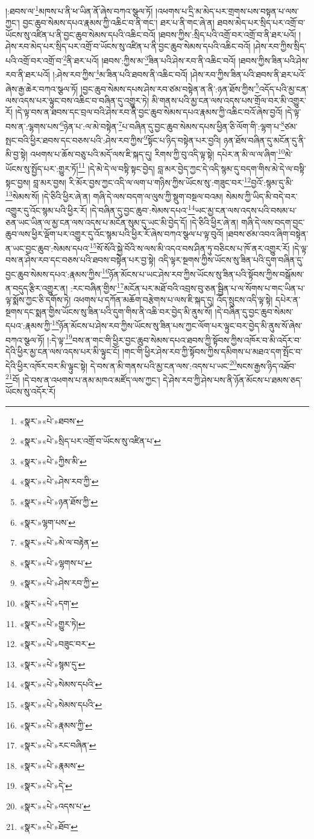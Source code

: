 །:ཐབས་ལ་\footnote{«སྣར་»«པེ་»ཐབས་}མཁས་པ་ནི་ཕ་ཡིན་ནོ་ཞེས་བཀའ་སྩལ་ཏོ། །འཕགས་པ་དྲི་མ་མེད་པར་གྲགས་པས་བསྟན་པ་ལས་ཀྱང་། བྱང་ཆུབ་སེམས་དཔའ་རྣམས་ཀྱི་འཆིང་བ་ནི་གང་། ཐར་པ་ནི་གང་ཞེ་ན། ཐབས་མེད་པར་སྲིད་པར་འགྲོ་བ་ཡོངས་སུ་འཛིན་པ་ནི་བྱང་ཆུབ་སེམས་དཔའི་འཆིང་བའོ། །ཐབས་ཀྱིས་:སྲིད་པའི་འགྲོ་བར་འགྲོ་བ་ནི་ཐར་པའོ། །ཤེས་རབ་མེད་པར་སྲིད་པར་འགྲོ་བ་ཡོངས་སུ་འཛིན་པ་ནི་བྱང་ཆུབ་སེམས་དཔའི་འཆིང་བའོ། །ཤེས་རབ་ཀྱིས་སྲིད་པའི་འགྲོ་བར་འགྲོ་བ་\footnote{«སྣར་»«པེ་»སྲིད་པར་འགྲོ་བ་ཡོངས་སུ་འཛིན་པ་}ནི་ཐར་པའོ། །ཐབས་:ཀྱིས་མ་\footnote{«སྣར་»«པེ་»ཀྱིས་མི་}ཟིན་པའི་ཤེས་རབ་ནི་འཆིང་བའོ། །ཐབས་ཀྱིས་ཟིན་པའི་ཤེས་རབ་ནི་ཐར་པའོ། །:ཤེས་རབ་ཀྱིས་\footnote{«སྣར་»«པེ་»ཤེས་རབ་ཀྱི་}མ་ཟིན་པའི་ཐབས་ནི་འཆིང་བའོ། །ཤེས་རབ་ཀྱིས་ཟིན་པའི་ཐབས་ནི་ཐར་པའོ་ཞེས་རྒྱ་ཆེར་བཀའ་སྩལ་ཏོ། །བྱང་ཆུབ་སེམས་དཔས་ཤེས་རབ་ཙམ་བསྟེན་ན་ནི་:ཉན་ཐོས་ཀྱིས་\footnote{«སྣར་»«པེ་»ཉན་ཐོས་ཀྱི་}འདོད་པའི་མྱ་ངན་ལས་འདས་པར་ལྟུང་བས་འཆིང་བ་བཞིན་དུ་འགྱུར་ཏེ། མི་གནས་པའི་མྱ་ངན་ལས་འདས་པས་གྲོལ་བར་མི་འགྱུར་རོ། །དེ་ལྟ་བས་ན་ཐབས་དང་བྲལ་བའི་ཤེས་རབ་ནི་བྱང་ཆུབ་སེམས་དཔའ་རྣམས་ཀྱི་འཆིང་བའོ་ཞེས་བྱའོ། །དེ་ལྟ་བས་ན་:ལྷགས་པས་\footnote{«སྣར་»ལྷག་པས་}ཉེན་པ་:ལ་མེ་བསྟེན་\footnote{«སྣར་»«པེ་»མེ་ལ་བརྟེན་}པ་བཞིན་དུ་བྱང་ཆུབ་སེམས་དཔས་ཕྱིན་ཅི་ལོག་གི་:ལྷག་པ་\footnote{«སྣར་»«པེ་»ལྷགས་པ་}ཙམ་སྤང་བའི་ཕྱིར་ཐབས་དང་བཅས་པའི་:ཤེས་རབ་ཀྱིས་\footnote{«སྣར་»«པེ་»ཤེས་རབ་ཀྱི་}སྟོང་པ་ཉིད་བསྟེན་པར་བྱའི། ཉན་ཐོས་བཞིན་དུ་མངོན་དུ་ནི་མི་བྱ་སྟེ། འཕགས་པ་ཆོས་བཅུ་པའི་མདོ་ལས་ཇི་སྐད་དུ། རིགས་ཀྱི་བུ་འདི་ལྟ་སྟེ། དཔེར་ན་མི་ལ་ལ་ཞིག་\footnote{«སྣར་»«པེ་»དག་}མེ་ཡོངས་སུ་སྤྱོད་པར་:གྱུར་ཏོ།\footnote{«སྣར་»«པེ་»གྱུར་ཏེ།} །དེ་མེ་དེ་ལ་བསྟི་སྟང་བྱེད། བླ་མར་བྱེད་ཀྱང་དེ་འདི་སྙམ་དུ་བདག་གིས་མེ་དེ་ལ་བསྟི་སྟང་བྱས། བླ་མར་བྱས། རི་མོར་བྱས་ཀྱང་འདི་ལ་ལག་པ་གཉིས་ཀྱིས་ཡོངས་སུ་:གཟུང་བར་\footnote{«སྣར་»«པེ་»བཟུང་བར་}བྱའོ་:སྙམ་དུ་མི་\footnote{«སྣར་»«པེ་»སྙམ་དུ་}སེམས་སོ། །དེ་ཅིའི་ཕྱིར་ཞེ་ན། གཞི་དེ་ལས་བདག་ལ་ལུས་ཀྱི་སྡུག་བསྔལ་བའམ། སེམས་ཀྱི་ཡིད་མི་བདེ་བར་འགྱུར་དུ་འོང་སྙམ་པའི་ཕྱིར་རོ། །དེ་བཞིན་དུ་བྱང་ཆུབ་:སེམས་དཔའ་\footnote{«སྣར་»«པེ་»སེམས་དཔའི་}ཡང་མྱ་ངན་ལས་འདས་པའི་བསམ་པ་ཅན་ཡང་ཡིན་ལ་མྱ་ངན་ལས་འདས་པ་མངོན་སུམ་དུ་ཡང་མི་བྱེད་དོ། །དེ་ཅིའི་ཕྱིར་ཞེ་ན། གཞི་དེ་ལས་བདག་བྱང་ཆུབ་ལས་ཕྱིར་ལྡོག་པར་འགྱུར་དུ་འོང་སྙམ་པའི་ཕྱིར་རོ་ཞེས་བཀའ་སྩལ་པ་ལྟ་བུའོ། །ཐབས་ཙམ་འབའ་ཞིག་བསྟེན་ན་ཡང་བྱང་ཆུབ་:སེམས་དཔའ་\footnote{«སྣར་»«པེ་»སེམས་དཔའི་}སོ་སོའི་སྐྱེ་བོའི་ས་ལས་མི་འདའ་བས་ཤིན་ཏུ་བཅིངས་པ་ཁོ་ནར་འགྱུར་རོ། །དེ་ལྟ་བས་ན་ཤེས་རབ་དང་བཅས་པའི་ཐབས་བསྟེན་པར་བྱ་སྟེ། འདི་ལྟར་སྔགས་ཀྱིས་ཡོངས་སུ་ཟིན་པའི་དུག་བཞིན་དུ་བྱང་ཆུབ་སེམས་དཔའ་:རྣམས་ཀྱིས་\footnote{«སྣར་»«པེ་»རྣམས་ཀྱི་}ཉོན་མོངས་པ་ཡང་ཤེས་རབ་ཀྱིས་ཡོངས་སུ་ཟིན་པའི་སྟོབས་ཀྱིས་བསྒོམས་ན་བདུད་རྩིར་འགྱུར་ན། :རང་བཞིན་གྱིས་\footnote{«སྣར་»«པེ་»རང་བཞིན་}མངོན་པར་མཐོ་བའི་འབྲས་བུ་ཅན་སྦྱིན་པ་ལ་སོགས་པ་གང་ཡིན་པ་ལྟ་སྨོས་ཀྱང་ཅི་དགོས་ཏེ། འཕགས་པ་དཀོན་མཆོག་བརྩེགས་པ་ལས་ཇི་སྐད་དུ། འོད་སྲུངས་འདི་ལྟ་སྟེ། དཔེར་ན་སྔགས་དང་སྨན་གྱིས་ཡོངས་སུ་ཟིན་པའི་དུག་གིས་ནི་འཆི་བར་བྱེད་མི་ནུས་སོ། །དེ་བཞིན་དུ་བྱང་ཆུབ་སེམས་དཔའ་:རྣམས་ཀྱི་\footnote{«སྣར་»«པེ་»རྣམས་}ཉོན་མོངས་པ་ཤེས་རབ་ཀྱིས་ཡོངས་སུ་ཟིན་པས་ཀྱང་ལོག་པར་ལྟུང་བར་བྱེད་མི་ནུས་སོ་ཞེས་བཀའ་སྩལ་ཏོ། །:དེ་ལྟ་\footnote{«སྣར་»«པེ་»དེ་}བས་ན་གང་གི་ཕྱིར་བྱང་ཆུབ་སེམས་དཔའ་ཐབས་ཀྱི་སྟོབས་ཀྱིས་འཁོར་བ་མི་འདོར་བ་དེའི་ཕྱིར་མྱ་ངན་ལས་འདས་པར་མི་ལྟུང་ངོ། །གང་གི་ཕྱིར་ཤེས་རབ་ཀྱི་སྟོབས་ཀྱིས་དམིགས་པ་མཐའ་དག་སྤོང་བ་དེའི་ཕྱིར་འཁོར་བར་མི་ལྟུང་སྟེ། དེ་བས་ན་མི་གནས་པའི་མྱ་ངན་ལས་:འདས་པ་ཡང་\footnote{«སྣར་»«པེ་»འདས་པ་}སངས་རྒྱས་ཉིད་འཐོབ་\footnote{«སྣར་»«པེ་»ཐོབ་}བོ། །དེ་བས་ན་འཕགས་པ་ནམ་མཁའ་མཛོད་ལས་ཀྱང་། དེ་ཤེས་རབ་ཀྱི་ཤེས་པས་ནི་ཉོན་མོངས་པ་ཐམས་ཅད་ཡོངས་སུ་འདོར་རོ། 